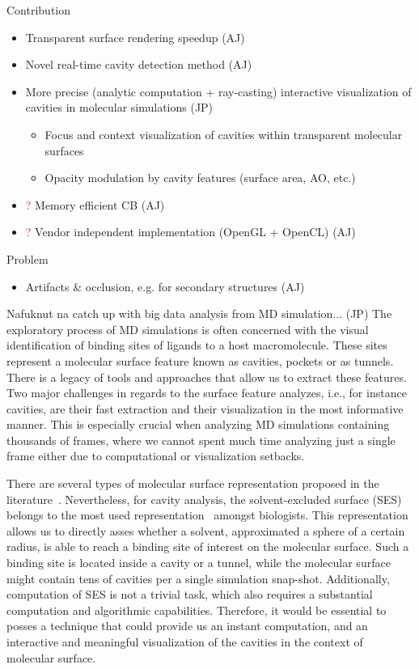 Contribution
\begin{itemize}
  \item Transparent surface rendering speedup (AJ)
	\item Novel real-time cavity detection method (AJ)
	\item More precise (analytic computation + ray-casting) interactive visualization of cavities in molecular simulations (JP)
	\begin{itemize}
		\item Focus and context visualization of cavities within transparent molecular surfaces
		\item Opacity modulation by cavity features (surface area, AO, etc.)
	\end{itemize}
	\item \textcolor{red}{?} Memory efficient CB (AJ)
	\item \textcolor{red}{?} Vendor independent implementation (OpenGL + OpenCL) (AJ)
\end{itemize}

Problem
\begin{itemize}
  \item Artifacts \& occlusion, e.g. for secondary structures (AJ)
\end{itemize}

Nafuknut na catch up with big data analysis from MD simulation... (JP)
The exploratory process of MD simulations is often concerned with the visual identification of binding sites of ligands to a host macromolecule.
These sites represent a molecular surface feature known as cavities, pockets or as tunnels.
There is a legacy of tools and approaches that allow us to extract these features.
Two major challenges in regards to the surface feature analyzes, i.e., for instance cavities, are their fast extraction and their visualization in the most informative manner. This is especially crucial when analyzing MD simulations containing thousands of frames, where we cannot spent much time analyzing just a single frame either due to computational or visualization setbacks. 

There are several types of molecular surface representation proposed in the literature~\cite{STAR2015}. Nevertheless, for cavity analysis,  the solvent-excluded surface (SES) belongs to the most used representation~\cite{todo} amongst biologists. This representation allows us to directly asses whether a solvent, approximated a sphere of a certain radius, is able to reach a binding site of interest on the molecular surface. Such a binding site is located inside a cavity or a tunnel, while the molecular surface might contain tens of cavities per a single simulation snap-shot. Additionally, computation of SES is not a trivial task, which also requires a substantial computation and algorithmic capabilities. Therefore, it would be essential to posses a technique that could provide us an instant computation, and an interactive and meaningful visualization of the cavities in the context of molecular surface.

